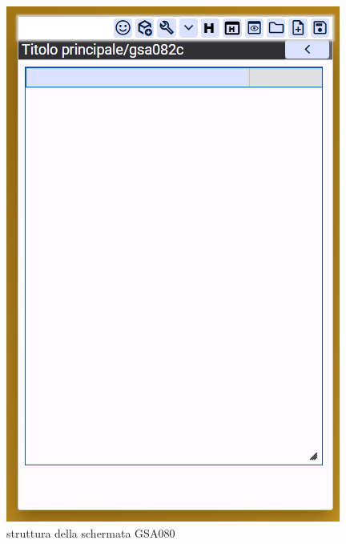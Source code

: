 \documentclass[target=bach,aauheader=,style=]{thud}
\begin{document}
\begin{figure}[h]
\begin{minipage}{0.45\textwidth}
        \includegraphics[width=\linewidth]{screenshot/Struttura_gsa082.png}
        \caption{struttura della schermata GSA080}
    \end{minipage}
\end{figure}
\end{document}
